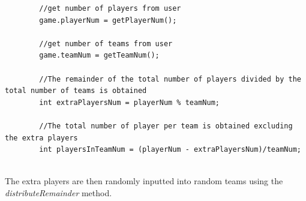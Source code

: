 \documentclass[a4paper,12pt]{extarticle}
\begin{document}
\begin{lstlisting}
        //get number of players from user
        game.playerNum = getPlayerNum();

        //get number of teams from user
        game.teamNum = getTeamNum();

        //The remainder of the total number of players divided by the total number of teams is obtained
        int extraPlayersNum = playerNum % teamNum;

        //The total number of player per team is obtained excluding the extra players
        int playersInTeamNum = (playerNum - extraPlayersNum)/teamNum;


\end{lstlisting}

\noindent The extra players are then randomly inputted into random teams using the \textit{distributeRemainder} method.
\end{document}
